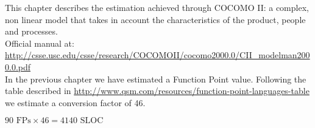 This chapter describes the estimation achieved through COCOMO II: a complex, non linear model that takes in account the characteristics of the product, people and processes.\\

Official manual at: {\small \url{http://csse.usc.edu/csse/research/COCOMOII/cocomo2000.0/CII_modelman2000.0.pdf}}\\

In the previous chapter we have estimated a Function Point value. Following the table described in {\small \url{http://www.qsm.com/resources/function-point-languages-table}} we estimate a conversion factor of 46.

\begin{center}
	$90\textrm{ FPs} \times 46 = 4140 \textrm{ SLOC}$
\end{center}